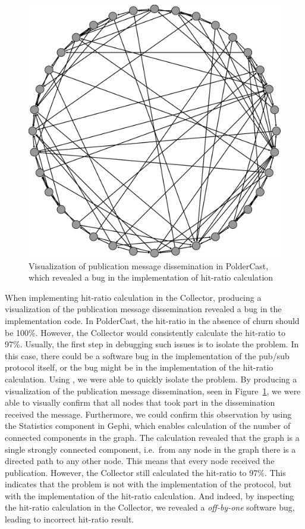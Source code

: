 \begin{figure}[ht!]
    \centering
    \includegraphics[width=\linewidth]{figures/hitratiobug}
    \caption{Visualization of publication message dissemination in
        PolderCast, which revealed a bug in the implementation of hit-ratio
        calculation}
   \label{fig:hitratiobug}
\end{figure}

When implementing hit-ratio calculation in the Collector, producing a
visualization of the publication message dissemination revealed a bug in the implementation code.
In PolderCast, the hit-ratio in the absence of churn should be 100\%.
However, the Collector would consistently calculate the hit-ratio to
97\%. Usually, the first step in debugging such issues is to isolate the
problem. In this case, there could be a software bug in the
implementation of the pub/sub protocol itself, or the bug might be in
the implementation of the hit-ratio calculation. Using \demo, we were
able to quickly isolate the problem. By producing a visualization of the
publication message dissemination, seen in Figure~\ref{fig:hitratiobug},
we were able to visually confirm that all nodes that took part in the dissemination
received the message. Furthermore, we could confirm this observation by
using the Statistics component in Gephi, which enables calculation of
the number of connected components in the graph.  The calculation
revealed that the graph is a single strongly connected component, i.e.\
from any node in the graph there is a directed path to any other node.
This means that every node received the publication. However, the
Collector still calculated the hit-ratio to 97\%. This indicates that
the problem is not with the implementation of the protocol, but with the
implementation of the hit-ratio calculation. And indeed, by inspecting
the hit-ratio calculation in the Collector, we revealed a
\emph{off-by-one} software bug, leading to incorrect hit-ratio result.


